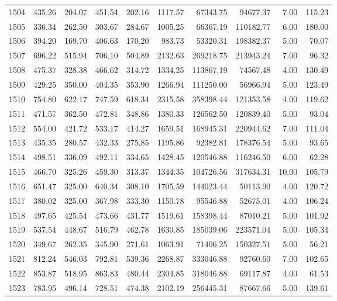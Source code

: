 \begin{tabular}{lrrrrrrrrr}
1504 & 435.26 & 204.07 & 451.54 & 202.16 & 1117.57 & 67343.75 & 94677.37 & 7.00 & 115.23 \\
1505 & 336.34 & 262.50 & 303.67 & 284.67 & 1005.25 & 66367.19 & 110182.77 & 6.00 & 180.00 \\
1506 & 394.20 & 169.70 & 406.63 & 170.20 & 983.73 & 53320.31 & 198382.37 & 5.00 & 70.07 \\
1507 & 696.22 & 515.94 & 706.10 & 504.89 & 2132.63 & 269218.75 & 213943.24 & 7.00 & 96.32 \\
1508 & 475.37 & 328.38 & 466.62 & 314.72 & 1334.25 & 113867.19 & 74567.48 & 4.00 & 130.49 \\
1509 & 429.25 & 350.00 & 404.35 & 353.90 & 1266.94 & 111250.00 & 56966.94 & 5.00 & 123.49 \\
1510 & 754.80 & 622.17 & 747.59 & 618.34 & 2315.58 & 358398.44 & 121353.58 & 4.00 & 119.62 \\
1511 & 471.57 & 362.50 & 472.81 & 348.86 & 1380.33 & 126562.50 & 120839.40 & 5.00 & 93.04 \\
1512 & 554.00 & 421.72 & 533.17 & 414.27 & 1659.51 & 168945.31 & 220944.62 & 7.00 & 111.04 \\
1513 & 435.35 & 280.57 & 432.33 & 275.85 & 1195.86 & 92382.81 & 178376.54 & 5.00 & 93.65 \\
1514 & 498.51 & 336.09 & 492.11 & 334.65 & 1428.45 & 120546.88 & 116246.50 & 6.00 & 62.28 \\
1515 & 466.70 & 325.26 & 459.30 & 313.37 & 1344.35 & 104726.56 & 317634.31 & 10.00 & 105.79 \\
1516 & 651.47 & 325.00 & 640.34 & 308.10 & 1705.59 & 144023.44 & 50113.90 & 4.00 & 120.72 \\
1517 & 380.02 & 325.00 & 367.98 & 333.30 & 1150.78 & 95546.88 & 52675.01 & 4.00 & 106.24 \\
1518 & 497.65 & 425.54 & 473.66 & 431.77 & 1519.61 & 158398.44 & 87010.21 & 5.00 & 101.92 \\
1519 & 537.54 & 448.67 & 516.79 & 462.78 & 1630.85 & 185039.06 & 223571.04 & 5.00 & 105.34 \\
1520 & 349.67 & 262.35 & 345.90 & 271.61 & 1063.91 & 71406.25 & 150327.51 & 5.00 & 56.21 \\
1521 & 812.24 & 546.03 & 792.81 & 539.36 & 2268.87 & 333046.88 & 92760.60 & 7.00 & 102.65 \\
1522 & 853.87 & 518.95 & 863.83 & 480.44 & 2304.85 & 318046.88 & 69117.87 & 4.00 & 61.53 \\
1523 & 783.95 & 496.14 & 728.51 & 474.38 & 2102.19 & 256445.31 & 87667.66 & 5.00 & 139.61 \\

\end{tabular}
